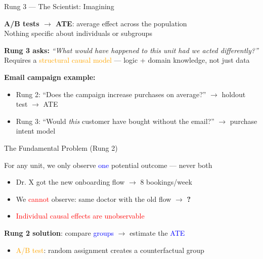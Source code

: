\documentclass{beamer}
\newcommand{\blue}[1]{\textcolor{blue}{#1}}
\newcommand{\red}[1]{\textcolor{red}{#1}}
\newcommand{\orange}[1]{\textcolor{orange}{#1}}
\begin{document}
\begin{frame}{Rung 3 --- The Scientist: Imagining }

\textbf{A/B tests $\rightarrow$ ATE}: average effect across the population \\
{\footnotesize Nothing specific about individuals or subgroups}

\vspace{0.06cm}
\textbf{Rung 3 asks:} \textit{``What would have happened to \emph{this} unit had we acted differently?''} \\
{\footnotesize Requires a \orange{structural causal model} --- logic + domain knowledge, not just data}

\vspace{0.06cm}
\textbf{Email campaign example:}
\begin{itemize}\setlength{\itemsep}{0.02cm}
    \item {\small Rung 2: ``Does the campaign increase purchases on average?'' $\rightarrow$ holdout test $\rightarrow$ ATE}
    \item {\small Rung 3: ``Would \emph{this} customer have bought without the email?'' $\rightarrow$ purchase intent model}
\end{itemize}

\end{frame}


\begin{frame}{The Fundamental Problem (Rung 2) }

For any unit, we only observe \blue{one} potential outcome --- never both

\vspace{0.1cm}
\begin{itemize}\setlength{\itemsep}{0.05cm}
    \item Dr. X got the new onboarding flow $\rightarrow$ 8 bookings/week
    \item We \red{cannot} observe: same doctor with the old flow $\rightarrow$ \textbf{?}
    \item \red{Individual causal effects are unobservable}
\end{itemize}

\vspace{0.1cm}
\textbf{Rung 2 solution}: compare \blue{groups} $\rightarrow$ estimate the \blue{ATE}

\vspace{0.05cm}
\begin{itemize}\setlength{\itemsep}{0.05cm}
    \item \orange{A/B test}: random assignment creates a counterfactual group
\end{itemize}

\end{frame}
\end{document}
